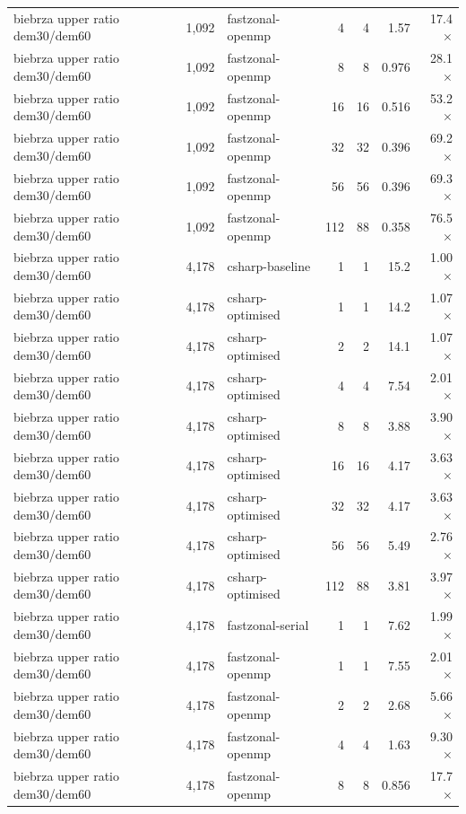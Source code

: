 \begin{tabular}{lrlrrrr}
biebrza upper ratio dem30/dem60 & 1,092 & fastzonal-openmp & 4 & 4 & 1.57 & 17.4$\times$ \\
biebrza upper ratio dem30/dem60 & 1,092 & fastzonal-openmp & 8 & 8 & 0.976 & 28.1$\times$ \\
biebrza upper ratio dem30/dem60 & 1,092 & fastzonal-openmp & 16 & 16 & 0.516 & 53.2$\times$ \\
biebrza upper ratio dem30/dem60 & 1,092 & fastzonal-openmp & 32 & 32 & 0.396 & 69.2$\times$ \\
biebrza upper ratio dem30/dem60 & 1,092 & fastzonal-openmp & 56 & 56 & 0.396 & 69.3$\times$ \\
biebrza upper ratio dem30/dem60 & 1,092 & fastzonal-openmp & 112 & 88 & 0.358 & 76.5$\times$ \\
biebrza upper ratio dem30/dem60 & 4,178 & csharp-baseline & 1 & 1 & 15.2 & 1.00$\times$ \\
biebrza upper ratio dem30/dem60 & 4,178 & csharp-optimised & 1 & 1 & 14.2 & 1.07$\times$ \\
biebrza upper ratio dem30/dem60 & 4,178 & csharp-optimised & 2 & 2 & 14.1 & 1.07$\times$ \\
biebrza upper ratio dem30/dem60 & 4,178 & csharp-optimised & 4 & 4 & 7.54 & 2.01$\times$ \\
biebrza upper ratio dem30/dem60 & 4,178 & csharp-optimised & 8 & 8 & 3.88 & 3.90$\times$ \\
biebrza upper ratio dem30/dem60 & 4,178 & csharp-optimised & 16 & 16 & 4.17 & 3.63$\times$ \\
biebrza upper ratio dem30/dem60 & 4,178 & csharp-optimised & 32 & 32 & 4.17 & 3.63$\times$ \\
biebrza upper ratio dem30/dem60 & 4,178 & csharp-optimised & 56 & 56 & 5.49 & 2.76$\times$ \\
biebrza upper ratio dem30/dem60 & 4,178 & csharp-optimised & 112 & 88 & 3.81 & 3.97$\times$ \\
biebrza upper ratio dem30/dem60 & 4,178 & fastzonal-serial & 1 & 1 & 7.62 & 1.99$\times$ \\
biebrza upper ratio dem30/dem60 & 4,178 & fastzonal-openmp & 1 & 1 & 7.55 & 2.01$\times$ \\
biebrza upper ratio dem30/dem60 & 4,178 & fastzonal-openmp & 2 & 2 & 2.68 & 5.66$\times$ \\
biebrza upper ratio dem30/dem60 & 4,178 & fastzonal-openmp & 4 & 4 & 1.63 & 9.30$\times$ \\
biebrza upper ratio dem30/dem60 & 4,178 & fastzonal-openmp & 8 & 8 & 0.856 & 17.7$\times$ \\

\end{tabular}
